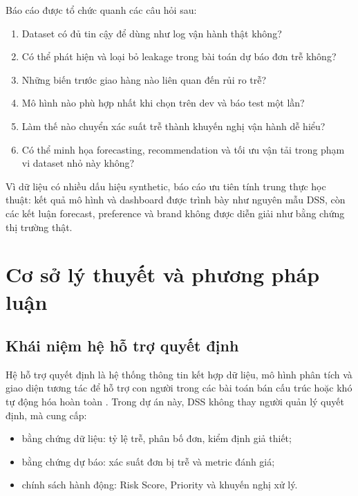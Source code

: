 \documentclass[12pt,a4paper,oneside]{report}
\begin{document}
Báo cáo được tổ chức quanh các câu hỏi sau:

\begin{enumerate}[leftmargin=*]
  \item Dataset có đủ tin cậy để dùng như log vận hành thật không?
  \item Có thể phát hiện và loại bỏ leakage trong bài toán dự báo đơn trễ không?
  \item Những biến trước giao hàng nào liên quan đến rủi ro trễ?
  \item Mô hình nào phù hợp nhất khi chọn trên dev và báo test một lần?
  \item Làm thế nào chuyển xác suất trễ thành khuyến nghị vận hành dễ hiểu?
  \item Có thể minh họa forecasting, recommendation và tối ưu vận tải trong
        phạm vi dataset nhỏ này không?
\end{enumerate}

\begin{insight}
Vì dữ liệu có nhiều dấu hiệu synthetic, báo cáo ưu tiên tính trung thực học
thuật: kết quả mô hình và dashboard được trình bày như nguyên mẫu DSS, còn các
kết luận forecast, preference và brand không được diễn giải như bằng chứng thị
trường thật.
\end{insight}

\chapter{Cơ sở lý thuyết và phương pháp luận}

\section{Khái niệm hệ hỗ trợ quyết định}

Hệ hỗ trợ quyết định là hệ thống thông tin kết hợp dữ liệu, mô hình phân tích
và giao diện tương tác để hỗ trợ con người trong các bài toán bán cấu trúc hoặc
khó tự động hóa hoàn toàn \cite{power2002}. Trong dự án này, DSS không thay
người quản lý quyết định, mà cung cấp:

\begin{itemize}[leftmargin=*]
  \item bằng chứng dữ liệu: tỷ lệ trễ, phân bố đơn, kiểm định giả thiết;
  \item bằng chứng dự báo: xác suất đơn bị trễ và metric đánh giá;
  \item chính sách hành động: Risk Score, Priority và khuyến nghị xử lý.
\end{itemize}
\end{document}
